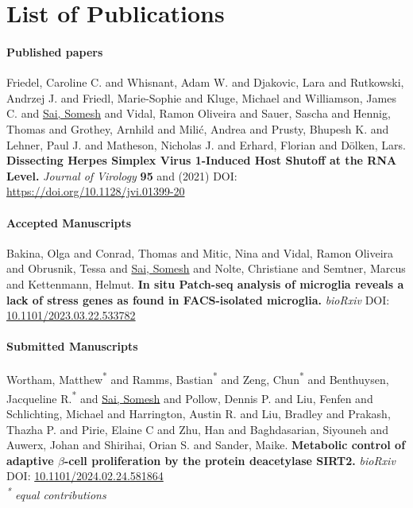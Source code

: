 \chapter{List of Publications}
\label{chp:publications}

\clearpage

\hypersetup{urlcolor=blue, linkcolor=blue, citecolor=blue}

\subsubsection{\Large Published papers}

Friedel, Caroline C. and Whisnant, Adam W. and Djakovic, Lara and Rutkowski, Andrzej J. and Friedl, Marie-Sophie and Kluge, Michael and Williamson, James C. and \underline{Sai, Somesh} and Vidal, Ramon Oliveira and Sauer, Sascha and Hennig, Thomas and Grothey, Arnhild and Milić, Andrea and Prusty, Bhupesh K. and Lehner, Paul J. and Matheson, Nicholas J. and Erhard, Florian and Dölken, Lars. \textbf{Dissecting Herpes Simplex Virus 1-Induced Host Shutoff at the RNA Level.} \textit{Journal of Virology} \textbf{95} and (2021) DOI: \href{https://doi.org/10.1128/jvi.01399-20}{https://doi.org/10.1128/jvi.01399-20}\\

\subsubsection{\Large Accepted Manuscripts}

Bakina, Olga and Conrad, Thomas and Mitic, Nina and Vidal, Ramon Oliveira and Obrusnik, Tessa and \underline{Sai, Somesh} and Nolte, Christiane and Semtner, Marcus and Kettenmann, Helmut. \textbf{In situ Patch-seq analysis of microglia reveals a lack of stress genes as found in FACS-isolated microglia.} \textit{bioRxiv} DOI: \href{10.1101/2023.03.22.533782}{10.1101/2023.03.22.533782}\\

\subsubsection{\Large Submitted Manuscripts}

Wortham, Matthew\textsuperscript{*} and Ramms, Bastian\textsuperscript{*} and Zeng, Chun\textsuperscript{*} and Benthuysen, Jacqueline R.\textsuperscript{*} and \underline{Sai, Somesh} and Pollow, Dennis P. and Liu, Fenfen and Schlichting, Michael and Harrington, Austin R. and Liu, Bradley  and Prakash, Thazha P. and Pirie, Elaine C and Zhu, Han and Baghdasarian, Siyouneh and Auwerx, Johan and Shirihai, Orian S. and Sander, Maike. \textbf{Metabolic control of adaptive $\beta$-cell proliferation by the protein deacetylase SIRT2.} \textit{bioRxiv} DOI: \href{10.1101/2024.02.24.581864}{10.1101/2024.02.24.581864}\\\textit{\textsuperscript{*} equal contributions}\\

